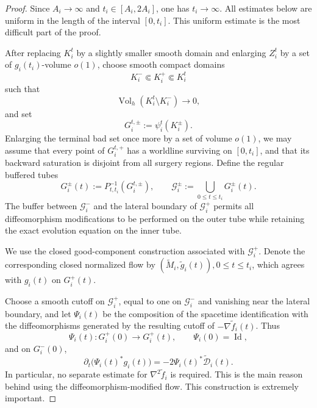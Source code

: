 \documentclass[10pt,a4paper]{amsart}
\begin{document}
\begin{proof}
Since \(A_i\to\infty\) and \(t_i\in[A_i,2A_i]\), one has
\(t_i\to\infty\). All estimates below are uniform in the length of the
interval \([0,t_i]\). This uniform estimate is the most difficult part of the proof. 

\noindent After replacing \(K_i^t\) by a slightly smaller smooth domain and
enlarging \(Z_i^t\) by a set of \(g_i(t_i)\)-volume \(o(1)\), choose
smooth compact domains
\[
        K_i^-\Subset K_i^+\Subset K_i^t
\]
such that
\[
        \operatorname{Vol}_h(K_i^t\setminus K_i^-)\to0,
\]
and set
\[
        G_i^{t,\pm}:=\psi_i^t(K_i^\pm).
\]
Enlarging the terminal bad set once more by a set of volume \(o(1)\), we
may assume that every point of \(G_i^{t,+}\) has a worldline surviving
on \([0,t_i]\), and that its backward saturation is disjoint from all
surgery regions. Define the regular buffered tubes
\[
        G_i^\pm(t):=P_{t,t_i}^{-1}(G_i^{t,\pm}),
        \qquad
        \mathcal G_i^\pm
        :=
        \bigcup_{0\leq t\leq t_i}G_i^\pm(t).
\]
The buffer between \(\mathcal G_i^-\) and the lateral boundary of
\(\mathcal G_i^+\) permits all diffeomorphism modifications to be
performed on the outer tube while retaining the exact evolution
equation on the inner tube.

\noindent We use the closed good-component construction associated with
\(\mathcal G_i^+\). Denote the corresponding closed normalized flow by
$(\widetilde M_i,\widetilde g_i(t)),
0\leq t\leq t_i$,
which agrees with \(g_i(t)\) on \(G_i^+(t)\).

\noindent Choose a smooth cutoff on \(\mathcal G_i^+\), equal to one on
\(\mathcal G_i^-\) and vanishing near the lateral boundary, and let
\(\Psi_i(t)\) be the composition of the spacetime identification with
the diffeomorphisms generated by the resulting cutoff of
\(-\nabla\widetilde f_i(t)\). Thus
\[
        \Psi_i(t):G_i^+(0)\longrightarrow G_i^+(t),
        \qquad
        \Psi_i(0)=\operatorname{Id},
\]
and on \(G_i^-(0)\),
\begin{equation}
\label{eq:modified-flow-metric-evolution}
        \partial_t\bigl(\Psi_i(t)^*g_i(t)\bigr)
        =
        -2\Psi_i(t)^*\widetilde{\mathcal D}_i(t).
\end{equation}
In particular, no separate estimate for
\(\nabla^2\widetilde f_i\) is required. This is the main reason behind using the diffeomorphism-modified flow. This construction is extremely important. 


\end{proof}
\end{document}
